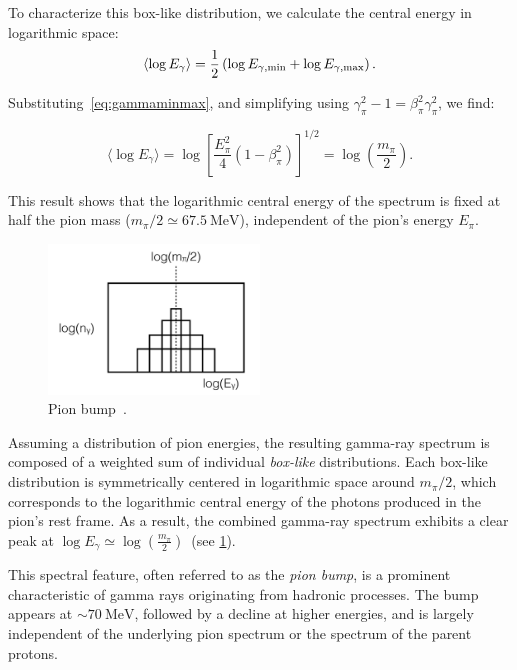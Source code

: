 To characterize this box-like distribution, we calculate the central energy in logarithmic space:
\begin{equation}
\langle \log E_\gamma \rangle = \frac{1}{2} \left( \log E_{\gamma, \rm min} + \log E_{\gamma, \rm max} \right).
\end{equation}

Substituting~\ref{eq:gammaminmax}, and simplifying using \(\gamma_\pi^2 - 1 = \beta_\pi^2 \gamma_\pi^2\), we find:
\begin{remark}
\begin{equation}
\langle \log E_\gamma \rangle 
= \log \left[ \frac{E_\pi^2}{4} (1-\beta_\pi^2) \right]^{1/2} 
=\log \left( \frac{m_\pi}{2} \right).
\end{equation}
\end{remark}

This result shows that the logarithmic central energy of the spectrum is fixed at half the pion mass (\(m_\pi / 2 \simeq 67.5~\text{MeV}\)), independent of the pion's energy \(E_\pi\).

\begin{figure}[t]
\centering
\includegraphics[width=0.5\textwidth]{figures/pion_bump.png}
\caption{Pion bump~.}
\label{fig:pionbump}
\end{figure}

Assuming a distribution of pion energies, the resulting gamma-ray spectrum is composed of a weighted sum of individual \emph{box-like} distributions. Each box-like distribution is symmetrically centered in logarithmic space around \(m_\pi / 2\), which corresponds to the logarithmic central energy of the photons produced in the pion's rest frame. As a result, the combined gamma-ray spectrum exhibits a clear peak at \( \log E_\gamma \simeq \log \left(\frac{m_\pi}{2}\right) \)~(see \ref{fig:pionbump}).  

This spectral feature, often referred to as the \emph{pion bump}, is a prominent characteristic of gamma rays originating from hadronic processes. The bump appears at \(\sim 70~\text{MeV}\), followed by a decline at higher energies, and is largely independent of the underlying pion spectrum or the spectrum of the parent protons.  

